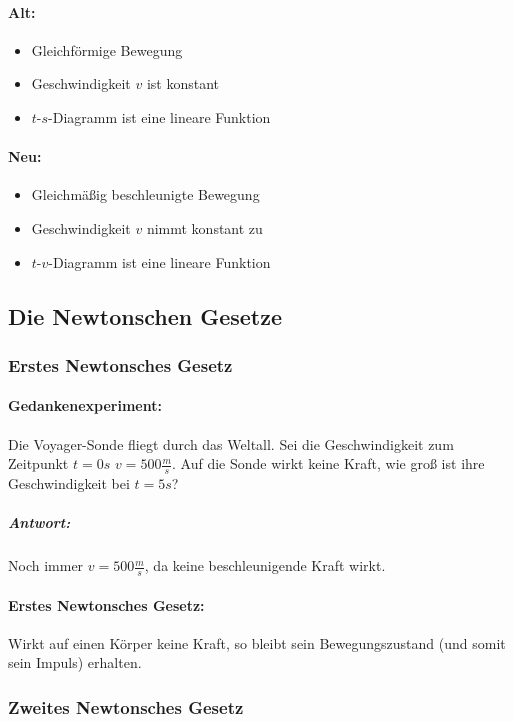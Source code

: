 \documentclass[12pt]{article}
\numberwithin{equation}{subsection}
\begin{document}
	\paragraph{Alt:}
	\begin{itemize}
		\item Gleichförmige Bewegung
		\item Geschwindigkeit $ v $ ist konstant
		\item $ t $-$ s $-Diagramm ist eine lineare Funktion
	\end{itemize}
	\paragraph{Neu:}
	\begin{itemize}
		\item Gleichmäßig beschleunigte Bewegung
		\item Geschwindigkeit $ v $ nimmt konstant zu
		\item $ t $-$ v $-Diagramm ist eine lineare Funktion
	\end{itemize}

	\subsection{Die Newtonschen Gesetze}
	\subsubsection{Erstes Newtonsches Gesetz}
	\paragraph{Gedankenexperiment:}
	Die Voyager-Sonde fliegt durch das Weltall. Sei die Geschwindigkeit zum Zeitpunkt $ t=0s $ $ v=500\frac{m}{s} $. Auf die Sonde wirkt keine Kraft, wie groß ist ihre Geschwindigkeit bei $ t=5s $?
	\subparagraph{Antwort:}
	Noch immer $ v=500\frac{m}{s} $, da keine beschleunigende Kraft wirkt.
	\paragraph{Erstes Newtonsches Gesetz:}
	Wirkt auf einen Körper keine Kraft, so bleibt sein Bewegungszustand (und somit sein Impuls) erhalten.
	
	\subsubsection{Zweites Newtonsches Gesetz}
\end{document}
